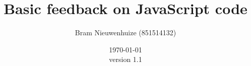 \documentclass{article}
\begin{document}
 

\title{Basic feedback on JavaScript code} \author{Bram Nieuwenhuize (851514132)} 
\date{\today \\version 1.1} \maketitle 






\printglossaries
\end{document}
